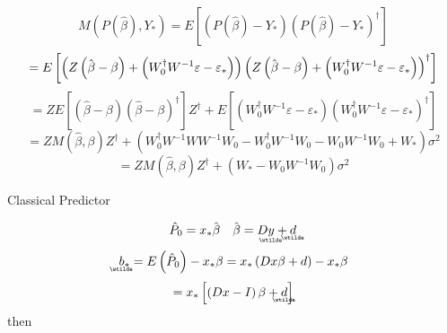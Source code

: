 \documentclass{article}
\begin{document}
\begin{equation*}
M\left( P\left( \hat{\beta}\right) ,Y_{\ast }\right) =E\left[ \left( P\left( 
\hat{\beta}\right) -Y_{\ast }\right) \left( P\left( \hat{\beta}\right)
-Y_{\ast }\right) ^{\dagger }\right]
\end{equation*}%
\begin{equation*}
=E\left[ \left( Z\left( \hat{\beta}-\beta \right) +\left( W_{0}^{\dagger
}W^{-1}\varepsilon -\varepsilon _{\ast }\right) \right) \left( Z\left( \hat{%
\beta}-\beta \right) +\left( W_{0}^{\dagger }W^{-1}\varepsilon -\varepsilon
_{\ast }\right) \right) ^{\dagger }\right]
\end{equation*}%
\begin{equation*}
=ZE\left[ \left( \hat{\beta}-\beta \right) \left( \hat{\beta}-\beta \right)
^{\dagger }\right] Z^{\dagger }+E\left[ \left( W_{0}^{\dagger
}W^{-1}\varepsilon -\varepsilon _{\ast }\right) \left( W_{0}^{\dagger
}W^{-1}\varepsilon -\varepsilon _{\ast }\right) ^{\dagger }\right]
\end{equation*}%
\begin{equation*}
=ZM\left( \hat{\beta},\beta \right) Z^{\dagger }+\left( W_{0}^{\dagger
}W^{-1}WW^{-1}W_{0}-W_{0}^{\dagger }W^{-1}W_{0}-W_{0}W^{-1}W_{0}+W_{\ast
}\right) \sigma ^{2}
\end{equation*}%
\begin{equation*}
=ZM\left( \hat{\beta},\beta \right) Z^{\dagger }+\left( W_{\ast
}-W_{0}W^{-1}W_{0}\right) \sigma ^{2}
\end{equation*}

\bigskip

Classical Predictor

\begin{equation*}
\hat{P}_{0}=x_{\ast }\hat{\beta}\quad \hat{\beta}=D%
\underaccent{\wtilde}{y}%
+%
\underaccent{\wtilde}{d}%
\end{equation*}%
\begin{equation*}
\underaccent{\wtilde}{b}%
_{\ast }=E\left( \hat{P}_{0}\right) -x_{\ast }\beta =x_{\ast }\left( Dx\beta
+d\right) -x_{\ast }\beta 
\end{equation*}%
\begin{equation*}
=x_{\ast }\left[ \left( Dx-I\right) \beta +%
\underaccent{\wtilde}{d}%
\right] 
\end{equation*}%
then
\end{document}
